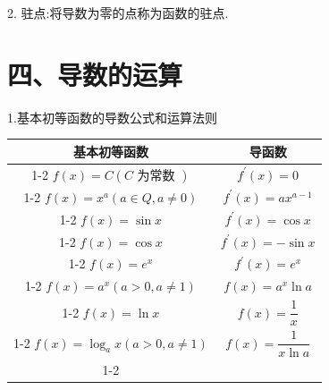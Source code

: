 2. 驻点:将导数为零的点称为函数的驻点.

\section*{四、导数的运算}

1.基本初等函数的导数公式和运算法则

\begin{center}
\begin{tabular}{|c|c|}
\hline
基本初等函数 & 导函数 \\
\cline{1-2}
$f\left( x\right)  = C\left( {C\text{ 为常数 }}\right)$ & ${f}^{\prime }\left( x\right)  = 0$ \\
\cline{1-2}
$f\left( x\right)  = {x}^{a}\left( {a \in  Q,a \neq  0}\right)$ & ${f}^{\prime }\left( x\right)  = a{x}^{a - 1}$ \\
\cline{1-2}
$f\left( x\right)  = \sin x$ & ${f}^{\prime }\left( x\right)  = \cos x$ \\
\cline{1-2}
$f\left( x\right)  = \cos x$ & ${f}^{\prime }\left( x\right)  =  - \sin x$ \\
\cline{1-2}
$f\left( x\right)  = {e}^{x}$ & ${f}^{\prime }\left( x\right)  = {e}^{x}$ \\
\cline{1-2}
$f\left( x\right)  = {a}^{x}\left( {a > 0,a \neq  1}\right)$ & $f\left( x\right)  = {a}^{x}\ln a$ \\
\cline{1-2}
$f\left( x\right)  = \ln x$ & $f\left( x\right)  = \dfrac{1}{x}$ \\
\cline{1-2}
$f\left( x\right)  = {\log }_{a}x\left( {a > 0,a \neq  1}\right)$ & $f\left( x\right)  = \dfrac{1}{x\ln a}$ \\
\cline{1-2}
\hline
\end{tabular}
\end{center}

